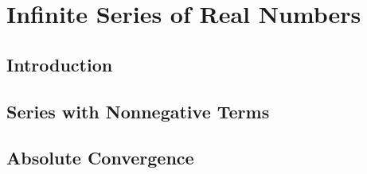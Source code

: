 \setcounter{chapter}{5}
\chapter{Infinite Series of Real Numbers}
\thispagestyle{empty}
\newpage
\section{Introduction}

\setcounter{Exercise}{3}


\vspace{12pt}



\vspace{12pt}

\setcounter{Exercise}{6}


\vspace{12pt}

\setcounter{Exercise}{8}


\vspace{12pt}

\setcounter{Exercise}{11}



\section{Series with Nonnegative Terms}



\vspace{12pt}



\vspace{12pt}



\vspace{12pt}

\setcounter{Exercise}{4}


\vspace{12pt}

\setcounter{Exercise}{6}


\vspace{12pt}

\setcounter{Exercise}{8}



\section{Absolute Convergence}

